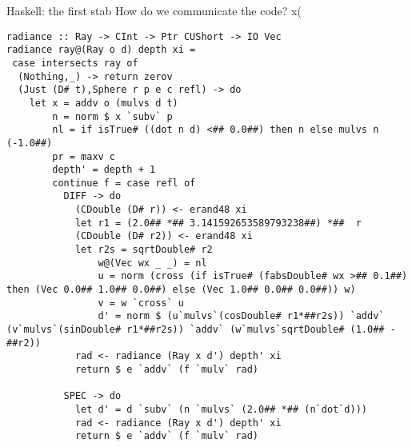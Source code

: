 \documentclass[8pt]{beamer}
\begin{document}
\begin{frame}[fragile]{Haskell: the first stab}
How do we communicate the code? x(

{\tiny
\begin{verbatim}
radiance :: Ray -> CInt -> Ptr CUShort -> IO Vec
radiance ray@(Ray o d) depth xi =
 case intersects ray of
  (Nothing,_) -> return zerov
  (Just (D# t),Sphere r p e c refl) -> do
    let x = addv o (mulvs d t)
        n = norm $ x `subv` p
        nl = if isTrue# ((dot n d) <## 0.0##) then n else mulvs n (-1.0##)
        pr = maxv c
        depth' = depth + 1
        continue f = case refl of
          DIFF -> do
            (CDouble (D# r)) <- erand48 xi
            let r1 = (2.0## *## 3.141592653589793238##) *##  r
            (CDouble (D# r2)) <- erand48 xi
            let r2s = sqrtDouble# r2
                w@(Vec wx _ _) = nl
                u = norm (cross (if isTrue# (fabsDouble# wx >## 0.1##) then (Vec 0.0## 1.0## 0.0##) else (Vec 1.0## 0.0## 0.0##)) w)
                v = w `cross` u
                d' = norm $ (u`mulvs`(cosDouble# r1*##r2s)) `addv` (v`mulvs`(sinDouble# r1*##r2s)) `addv` (w`mulvs`sqrtDouble# (1.0## -##r2))
            rad <- radiance (Ray x d') depth' xi
            return $ e `addv` (f `mulv` rad)

          SPEC -> do
            let d' = d `subv` (n `mulvs` (2.0## *## (n`dot`d)))
            rad <- radiance (Ray x d') depth' xi
            return $ e `addv` (f `mulv` rad)


\end{verbatim}}
\end{frame}
\end{document}
